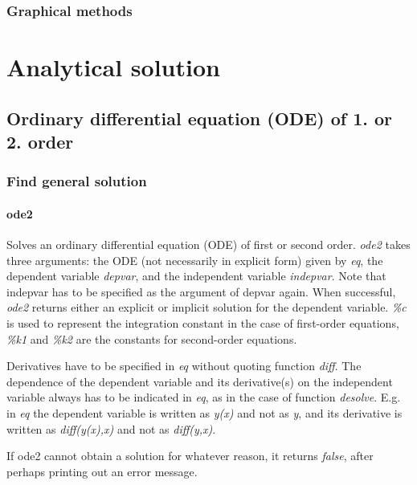 \documentclass[../Maxima_Workbook.tex]{subfiles}
\begin{document}
\subsubsection{Graphical methods}

\section{Analytical solution}

\subsection{Ordinary differential equation (ODE) of  1. or 2. order}

\subsubsection{Find general solution}

\paragraph{ode2} \mbox{}\label{DE3}

\lzz {} \hfill \tcr{[function]}

\lz Solves an ordinary differential equation (ODE) of first or second order. \emph{ode2} takes three arguments: the ODE (not necessarily in explicit form) given by \emph{eq}, the dependent variable \emph{depvar}, and the independent variable \emph{indepvar}. Note that indepvar has to be specified as the argument of depvar again. When successful, \emph{ode2} returns either an explicit or implicit solution for the dependent variable. \emph{\%c} is used to represent the integration constant in the case of first-order equations, \emph{\%k1} and \emph{\%k2} are the constants for second-order equations. 

\lz Derivatives have to be specified in \emph{eq} without quoting function \emph{diff}. The dependence of the dependent variable and its derivative(s) on the independent variable always has to be indicated in \emph{eq}, as in the case of function \emph{desolve}. E.g. in \emph{eq} the dependent variable is written as \emph{y(x)} and not as \emph{y}, and its derivative is written as \emph{diff(y(x),x)} and not as \emph{diff(y,x)}. 

\lz If ode2 cannot obtain a solution for whatever reason, it returns \emph{false}, after perhaps printing out an error message. 
\end{document}
